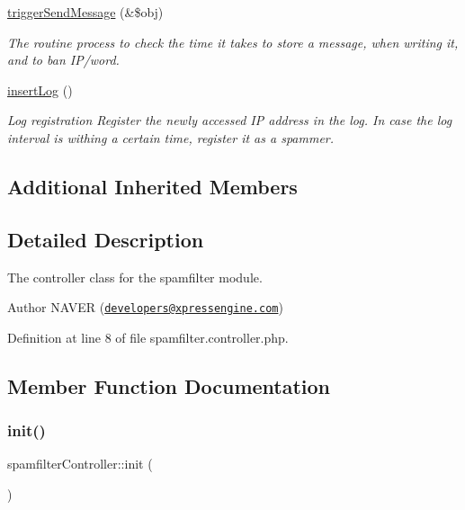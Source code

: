 \begin{DoxyCompactItemize}
\hyperlink{classspamfilterController_ab449e4ff64d26ae0ad3660522dbd396f}{trigger\+Send\+Message} (\&\$obj)
\begin{DoxyCompactList}\small\item\em The routine process to check the time it takes to store a message, when writing it, and to ban I\+P/word. \end{DoxyCompactList}\item 
\hyperlink{classspamfilterController_a14e2968cb7b9688a6b59b4f02a54a743}{insert\+Log} ()
\begin{DoxyCompactList}\small\item\em Log registration Register the newly accessed IP address in the log. In case the log interval is withing a certain time, register it as a spammer. \end{DoxyCompactList}\end{DoxyCompactItemize}
\subsection*{Additional Inherited Members}


\subsection{Detailed Description}
The controller class for the spamfilter module. 

\begin{DoxyAuthor}{Author}
N\+A\+V\+ER (\href{mailto:developers@xpressengine.com}{\tt developers@xpressengine.\+com}) 
\end{DoxyAuthor}


Definition at line 8 of file spamfilter.\+controller.\+php.



\subsection{Member Function Documentation}
\mbox{\label{classspamfilterController_a8204da601e789d60dbdfe0f692537e70}} 
\subsubsection{\texorpdfstring{init()}{init()}}
{\footnotesize\ttfamily spamfilter\+Controller\+::init (\begin{DoxyParamCaption}{ }\end{DoxyParamCaption})}



